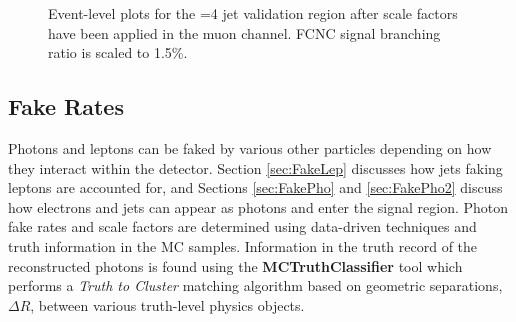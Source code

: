 \begin{figure}[h!]
\hfil 
{}
\caption{Event-level plots for the =4 jet validation region after scale factors have been applied in the muon channel.  FCNC signal branching ratio is scaled to 1.5\%.}
\label{fig:VR3mujpostscale}
\end{figure}
\subsection{Fake Rates}
\label{sec:Fakes}

Photons and leptons can be faked by various other particles depending on how they interact within the detector.  Section \ref{sec:FakeLep} discusses how jets faking leptons are accounted for, and Sections \ref{sec:FakePho} and \ref{sec:FakePho2} discuss how electrons and jets can appear as photons and enter the signal region.  Photon fake rates and scale factors are determined using data-driven techniques and truth information in the MC samples.  Information in the truth record of the reconstructed photons is found using the \textbf{MCTruthClassifier} tool which performs a \textit{Truth to Cluster} matching algorithm based on geometric separations, $\Delta R$, between various truth-level physics objects.

